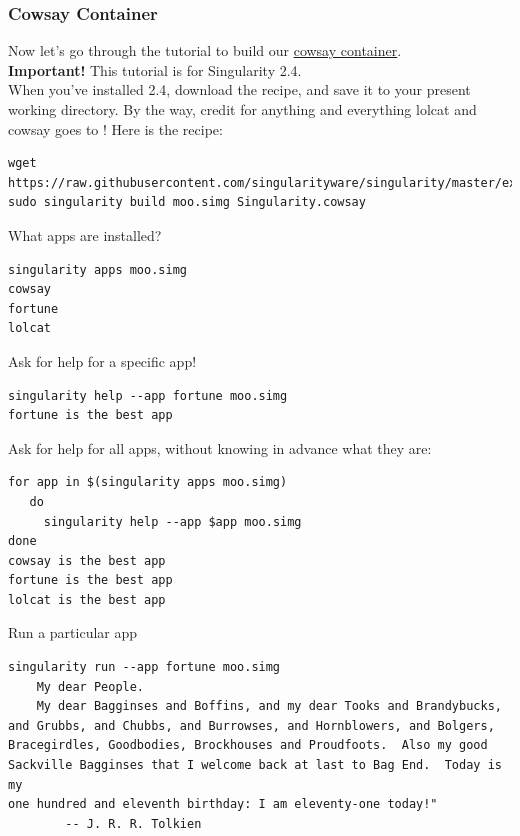 \documentclass[a4paper]{article}
\begin{document}
\subsubsection{Cowsay Container}

Now let’s go through the tutorial to build our \href{https://github.com/singularityware/singularity/blob/development/examples/apps/Singularity.cowsay}{cowsay container}.\\[0.1in]

\textbf{Important!} This tutorial is for Singularity 2.4.\\[0.1in]

When you’ve installed 2.4, download the recipe, and save it to your present working directory. By the way, credit for anything and everything lolcat and cowsay goes to \href{https://www.github.com/GodLoveD}{\@GodLoveD}! Here is the recipe:

\begin{lstlisting}[frame=single]  
wget https://raw.githubusercontent.com/singularityware/singularity/master/examples/apps/Singularity.cowsay
sudo singularity build moo.simg Singularity.cowsay
\end{lstlisting}

What apps are installed?

\begin{lstlisting}[frame=single] 
singularity apps moo.simg
cowsay
fortune
lolcat 
\end{lstlisting}

Ask for help for a specific app!

\begin{lstlisting}[frame=single]
singularity help --app fortune moo.simg
fortune is the best app  
\end{lstlisting}

Ask for help for all apps, without knowing in advance what they are: \\[0.1in]

\begin{lstlisting}[frame=single]
for app in $(singularity apps moo.simg)
   do
     singularity help --app $app moo.simg
done
cowsay is the best app
fortune is the best app
lolcat is the best app  
\end{lstlisting}

Run a particular app\\[0.1in]

\begin{lstlisting}[frame=single]  
singularity run --app fortune moo.simg
	My dear People.
	My dear Bagginses and Boffins, and my dear Tooks and Brandybucks,
and Grubbs, and Chubbs, and Burrowses, and Hornblowers, and Bolgers,
Bracegirdles, Goodbodies, Brockhouses and Proudfoots.  Also my good
Sackville Bagginses that I welcome back at last to Bag End.  Today is my
one hundred and eleventh birthday: I am eleventy-one today!"
		-- J. R. R. Tolkien
\end{lstlisting}
\end{document}
